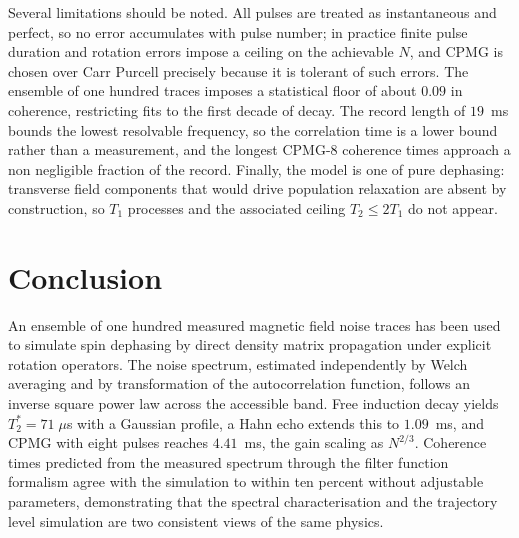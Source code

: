 \documentclass[10pt,twocolumn,a4paper]{article}
\begin{document}
Several limitations should be noted. All pulses are treated as instantaneous and
perfect, so no error accumulates with pulse number; in practice finite pulse
duration and rotation errors impose a ceiling on the achievable $N$, and CPMG is
chosen over Carr Purcell precisely because it is tolerant of such errors. The
ensemble of one hundred traces imposes a statistical floor of about $0.09$ in
coherence, restricting fits to the first decade of decay. The record length of
$19$~ms bounds the lowest resolvable frequency, so the correlation time is a lower
bound rather than a measurement, and the longest CPMG-8 coherence times approach a
non negligible fraction of the record. Finally, the model is one of pure dephasing:
transverse field components that would drive population relaxation are absent by
construction, so $T_1$ processes and the associated ceiling $T_2 \le 2T_1$ do not
appear.

\section{Conclusion}

An ensemble of one hundred measured magnetic field noise traces has been used to
simulate spin dephasing by direct density matrix propagation under explicit
rotation operators. The noise spectrum, estimated independently by Welch averaging
and by transformation of the autocorrelation function, follows an inverse square
power law across the accessible band. Free induction decay yields
$T_2^{*} = 71\;\mu$s with a Gaussian profile, a Hahn echo extends this to
$1.09$~ms, and CPMG with eight pulses reaches $4.41$~ms, the gain scaling as
$N^{2/3}$. Coherence times predicted from the measured spectrum through the filter
function formalism agree with the simulation to within ten percent without
adjustable parameters, demonstrating that the spectral characterisation and the
trajectory level simulation are two consistent views of the same physics.
\end{document}
